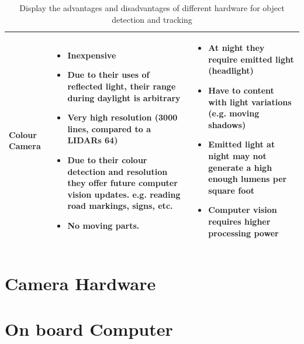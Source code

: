 \documentclass[a4paper]{report}
\begin{document}
\begin{table}[h]
{\begin{minipage}{\textwidth}
\begin{tabular}{ | m{3cm} | p{5cm} | p{5cm} |}
  Colour Camera &
  \begin{itemize}[leftmargin=*]   
    \item Inexpensive
    \item Due to their uses of reflected light, their range during daylight is arbitrary     	
    \item Very high resolution (3000 lines, compared to a LIDARs 64)    	
    \item Due to their colour detection and resolution they offer future computer vision updates. e.g. reading road markings, signs, etc.    	
    \item No moving parts.
  \end{itemize} &
  \begin{itemize}[leftmargin=*]   
    \item At night they require emitted light (headlight)
    \item Have to content with light variations (e.g. moving shadows)
    \item Emitted light at night may not generate a high enough lumens per square foot
    \item Computer vision requires higher processing power      
  \end{itemize} \\ \hline    
\end{tabular}


\caption[Table caption text]{Display the advantages and disadvantages of different hardware for object detection and tracking} 
\label{table:detect_hardware_comp}
\end{minipage} }
\end{table}

\section{Camera Hardware}

\section{On board Computer}
\end{document}
